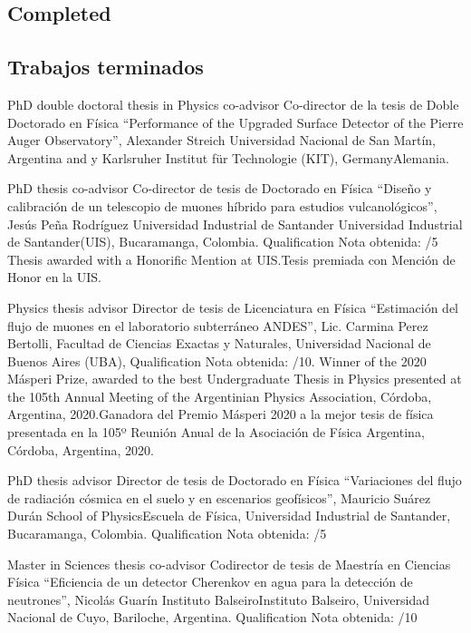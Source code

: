 \ifeng
\subsection*{Completed}
\else
\subsection*{Trabajos terminados}
\fi

\ifeng
PhD double doctoral thesis in Physics co-advisor
\else
Co-director de la tesis de Doble Doctorado en Física
\fi
``Performance of the Upgraded Surface Detector of the Pierre Auger Observatory'', Alexander Streich \at Universidad Nacional de San Martín, Argentina \ifeng and \else y \fi Karlsruher Institut für Technologie (KIT), \ifeng Germany\else Alemania\fi.

\ifeng
PhD thesis co-advisor
 \else
Co-director de tesis de Doctorado en Física
 \fi
``Diseño y calibración de un telescopio de muones híbrido para estudios vulcanológicos'', Jesús Peña Rodríguez \at \ifeng Universidad Industrial de Santander \else Universidad Industrial de Santander\fi (UIS), Bucaramanga, Colombia. \ifeng Qualification \else Nota obtenida: /5 \ifeng Thesis awarded with a Honorific Mention at UIS.\else Tesis premiada con Mención de Honor en la UIS.\fi

\ifeng
Physics thesis advisor
 \else
Director de tesis de Licenciatura en Física
 \fi
``Estimación del flujo de muones en el laboratorio subterráneo ANDES'', Lic.
Carmina Perez Bertolli, \at Facultad de Ciencias Exactas y Naturales, Universidad Nacional de Buenos Aires (UBA), \ifeng Qualification \else Nota obtenida: /10. \ifeng Winner of the 2020 Másperi Prize, awarded to the best Undergraduate Thesis in Physics presented at the 105th Annual Meeting of the Argentinian Physics Association, Córdoba, Argentina, 2020.\else Ganadora del Premio Másperi 2020 a la mejor tesis de física presentada en la 105º Reunión Anual de la Asociación de Física Argentina, Córdoba, Argentina, 2020. \fi

\ifeng
PhD thesis advisor
 \else
Director de tesis de Doctorado en Física
 \fi
``Variaciones del flujo de radiación cósmica en el suelo y en escenarios geofísicos'', Mauricio Suárez Durán \at \ifeng School of Physics\else Escuela de Física\fi, Universidad Industrial de Santander, Bucaramanga, Colombia. \ifeng Qualification \else Nota obtenida: /5

\ifeng
Master in Sciences thesis co-advisor
 \else
Codirector de tesis de Maestría en Ciencias Física
 \fi
``Eficiencia de un detector Cherenkov en agua para la detección de neutrones'', Nicolás Guarín \at \ifeng Instituto Balseiro\else Instituto Balseiro\fi, Universidad Nacional de Cuyo, Bariloche, Argentina. \ifeng Qualification \else Nota obtenida: /10

